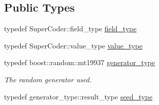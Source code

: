 \subsection*{Public Types}
\begin{DoxyCompactItemize}
\item 
typedef Super\-Coder\-::field\-\_\-type \hyperlink{classkodo_1_1sparse__uniform__generator_ae0ec16f8835489e578077281b84d861b}{field\-\_\-type}
\begin{DoxyCompactList}\small\item\em \end{DoxyCompactList}\item 
typedef Super\-Coder\-::value\-\_\-type \hyperlink{classkodo_1_1sparse__uniform__generator_a5c35a8da18386a36eb12fe2dcbc10518}{value\-\_\-type}
\begin{DoxyCompactList}\small\item\em \end{DoxyCompactList}\item 
\hypertarget{classkodo_1_1sparse__uniform__generator_a7fd1ceafd9cb51eac38ccf216c9e7fde}{typedef boost\-::random\-::mt19937 \hyperlink{classkodo_1_1sparse__uniform__generator_a7fd1ceafd9cb51eac38ccf216c9e7fde}{generator\-\_\-type}}\label{classkodo_1_1sparse__uniform__generator_a7fd1ceafd9cb51eac38ccf216c9e7fde}

\begin{DoxyCompactList}\small\item\em The random generator used. \end{DoxyCompactList}\item 
typedef generator\-\_\-type\-::result\-\_\-type \hyperlink{classkodo_1_1sparse__uniform__generator_aeb3e18efa56b33dcf69160029df5fff9}{seed\-\_\-type}
\begin{DoxyCompactList}\small\item\em \end{DoxyCompactList}\end{DoxyCompactItemize}
